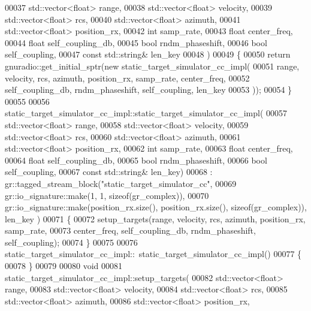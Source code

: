 \begin{DoxyCode}
00037             std::vector<float> range,
00038             std::vector<float> velocity,
00039             std::vector<float> rcs,
00040             std::vector<float> azimuth,
00041             std::vector<float> position\_rx,
00042             \textcolor{keywordtype}{int} samp_rate,
00043             \textcolor{keywordtype}{float} center_freq,
00044             \textcolor{keywordtype}{float} self\_coupling\_db,
00045             \textcolor{keywordtype}{bool} rndm\_phaseshift,
00046             \textcolor{keywordtype}{bool} self\_coupling,
00047             \textcolor{keyword}{const} std::string& len\_key
00048     )
00049     \{
00050       \textcolor{keywordflow}{return} gnuradio::get\_initial\_sptr(\textcolor{keyword}{new} static_target_simulator_cc_impl(
00051             range, velocity, rcs, azimuth, position\_rx, samp\_rate, center\_freq,
00052             self\_coupling\_db, rndm\_phaseshift, self\_coupling, len\_key
00053       ));
00054     \}
00055 
00056     static_target_simulator_cc_impl::static_target_simulator_cc_impl(
00057             std::vector<float> range,
00058             std::vector<float> velocity,
00059             std::vector<float> rcs,
00060             std::vector<float> azimuth,
00061             std::vector<float> position\_rx,
00062             \textcolor{keywordtype}{int} samp_rate,
00063             \textcolor{keywordtype}{float} center_freq,
00064             \textcolor{keywordtype}{float} self\_coupling\_db,
00065             \textcolor{keywordtype}{bool} rndm\_phaseshift,
00066             \textcolor{keywordtype}{bool} self\_coupling,
00067             \textcolor{keyword}{const} std::string& len\_key)
00068         : gr::tagged\_stream\_block(\textcolor{stringliteral}{"static\_target\_simulator\_cc"},
00069                 gr::io\_signature::make(1, 1, sizeof(gr\_complex)),
00070                 gr::io\_signature::make(position\_rx.size(), position\_rx.size(), sizeof(gr\_complex)), len\_key
      )
00071     \{
00072         setup_targets(range, velocity, rcs, azimuth, position\_rx, samp\_rate,
00073                 center\_freq, self\_coupling\_db, rndm\_phaseshift, self\_coupling);
00074     \}
00075 
00076     static_target_simulator_cc_impl::~static_target_simulator_cc_impl()
00077     \{
00078     \}
00079 
00080     \textcolor{keywordtype}{void}
00081     static_target_simulator_cc_impl::setup_targets(
00082         std::vector<float> range,
00083         std::vector<float> velocity,
00084         std::vector<float> rcs,
00085         std::vector<float> azimuth,
00086         std::vector<float> position\_rx,

\end{DoxyCode}

